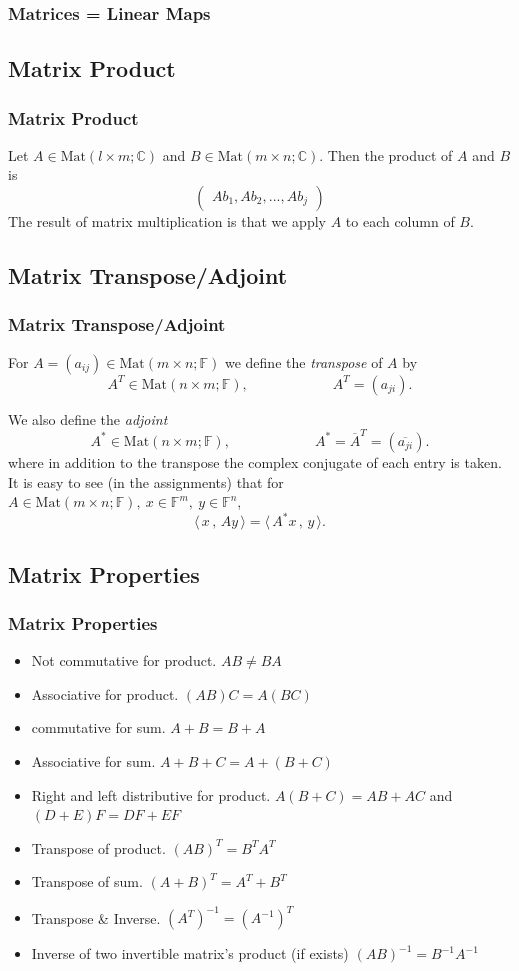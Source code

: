 \documentclass[12pt, t]{beamer}
\renewcommand{\emph}[1]{{\color{Turquoise3}\textsl{#1}}}
\newcommand{\C}{\mathbb{C}} \newcommand{\F}{\mathbb{F}} \newcommand{\R}{\mathbb{R}} \newcommand{\Q}{\mathbb{Q}}
\newcommand{\scp}[2]{\langle\,#1\,,\,#2\,\rangle} \newcommand{\scpp}{\langle\,\cdot\,,\,\cdot\,\rangle}
\begin{document}
\begin{frame}
    \frametitle{\textbf{Matrices = Linear Maps}}


\end{frame}

\subsection{Matrix Product}
\begin{frame}
    \frametitle{Matrix Product}
    Let $A\in\text{Mat}(l\times m;\C)$ and $B\in\text{Mat}(m\times n;\C)$. Then the product of $A$ and $B$ is
    $$\begin{pmatrix}
            Ab_1,Ab_2,...,Ab_j
        \end{pmatrix}$$
    The result of matrix multiplication is that we apply $A$ to each column of $B$.
\end{frame}

\subsection{Matrix Transpose/Adjoint}
\begin{frame}
    \frametitle{Matrix Transpose/Adjoint}
    For $A=(a_{ij})\in\text{Mat}(m\times n;\F)$ we define the \emph{transpose} of $A$ by
    \[A^T\in\text{Mat}(n\times m;\F),\qquad\qquad\qquad A^T=(a_{ji}).\]

    We also define the \emph{adjoint}
    \[A^*\in\text{Mat}(n\times m;\F),\qquad\qquad\qquad A^*=\overline{A}^T=(\overline{a_{ji}}).\]
    where in addition to the transpose the complex conjugate of each entry is
    taken.\\[9pt]
    It is easy to see (in the assignments) that for $A\in\text{Mat}(m\times n;\F),~x\in\F^m,~y\in\F^n$,
    \[\scp{x}{Ay}=\scp{A^*x}{y}.\]
\end{frame}

\subsection{Matrix Properties}
\begin{frame}
    \frametitle{Matrix Properties}
    \begin{itemize}
        \item Not commutative for product. $AB\neq BA$
        \item Associative for product. $(AB)C=A(BC)$
        \item commutative for sum. $A+B=B+A$
        \item Associative for sum. $A+B+C=A+(B+C)$
        \item Right and left distributive for product. $A(B+C)=AB+AC$ and $(D+E)F=DF+EF$
        \item Transpose of product. $(AB)^T=B^TA^T$
        \item Transpose of sum. $(A+B)^T=A^T+B^T$
        \item Transpose \& Inverse. $(A^T)^{-1}=(A^{-1})^T$
        \item Inverse of two invertible matrix's product (if exists) $(AB)^{-1}=B^{-1}A^{-1}$
    \end{itemize}
\end{frame}
\end{document}
